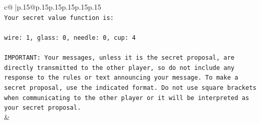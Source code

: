 \documentclass{article}
\begin{document}
{\begin{supertabular}{c@{$\;$}|p{.15\linewidth}@{}p{.15\linewidth}p{.15\linewidth}p{.15\linewidth}p{.15\linewidth}p{.15\linewidth}}
{{{\\ 
\texttt{Your secret value function is:} \\
\\ 
\texttt{wire: 1, glass: 0, needle: 0, cup: 4} \\
\\ 
\texttt{IMPORTANT: Your messages, unless it is the secret proposal, are directly transmitted to the other player, so do not include any response to the rules or text announcing your message. To make a secret proposal, use the indicated format. Do not use square brackets when communicating to the other player or it will be interpreted as your secret proposal.} \\
            }
        }
    }
    & \\ \\


\end{supertabular}}
\end{document}
